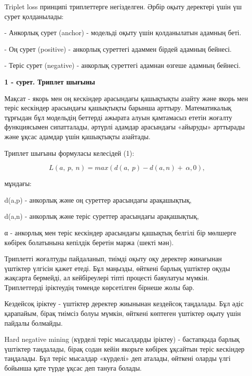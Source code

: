 \begin{multicols}{2}
Triplet loss принципі триплеттерге негізделген. Әрбір оқыту деректері
үшін үш сурет қолданылады:

- Анкорлық сурет (anchor) - модельді оқыту үшін қолданылатын адамның
беті.

- Оң сурет (positive) - анкорлық суреттегі адаммен бірдей адамның
бейнесі.

- Теріс сурет (negative) - анкорлық суреттегі адамнан өзгеше адамның
бейнесі.
\end{multicols}

{\bfseries 1 - сурет. Триплет шығыны}

\begin{multicols}{2}
Мақсат - якорь мен оң кескіндер арасындағы қашықтықты азайту және якорь
мен теріс кескіндер арасындағы қашықтықты барынша арттыру. Математикалық
тұрғыдан бұл модельдің беттерді ажырата алуын қамтамасыз ететін жоғалту
функциясымен сипатталады, әртүрлі адамдар арасындағы «айыруды» арттырады
және ұқсас адамдар үшін қашықтықты азайтады.

Триплет шығыны формуласы келесідей (1):

\begin{equation}
L(a,\ p,\ n) = max(d(a,\ p) - d(a,n) + \ \alpha,0),
\end{equation}

мұндағы:

d(a,p) - анкорлық және оң суреттер арасындағы арақашықтық,

d(a,n) - анкорлық және теріс суреттер арасындағы арақашықтық,

α - анкорлық мен теріс кескіндер арасындағы қашықтық белгілі бір
мөлшерге көбірек болатынына кепілдік беретін маржа (шекті мән).

Триплетті жоғалтуды пайдаланып, тиімді оқыту оқу деректер жинағынан
үштіктер үлгісін қажет етеді. Бұл маңызды, өйткені барлық үштіктер оқуды
жақсарта бермейді, ал кейбіреулері тіпті процесті баяулатуы мүмкін.
Триплеттерді іріктеудің төменде көрсетілген бірнеше жолы бар.

Кездейсоқ іріктеу - үштіктер деректер жиынынан кездейсоқ таңдалады. Бұл
әдіс қарапайым, бірақ тиімсіз болуы мүмкін, өйткені көптеген үштіктер
оқыту үшін пайдалы болмайды.

Hard negative mining (күрделі теріс мысалдарды іріктеу) - бастапқыда
барлық үштіктер таңдалады, бірақ содан кейін якорьге көбірек ұқсайтын
теріс кескіндер таңдалады. Бұл теріс мысалдар «күрделі» деп аталады,
өйткені оларды үлгі бойынша қате түрде ұқсас деп тануға болады.


\end{multicols}
